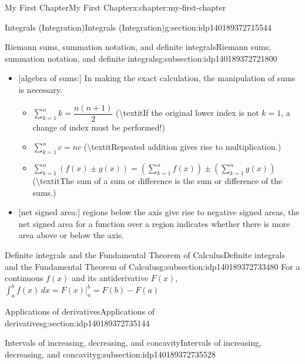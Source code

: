 \documentclass[oneside,10pt,]{book}
\begin{document}
\begin{chapterptx}{My First Chapter}{}{My First Chapter}{}{}{x:chapter:my-first-chapter}
\begin{sectionptx}{Integrals (Integration)}{}{Integrals (Integration)}{}{}{g:section:idp140189372715544}
\begin{subsectionptx}{Riemann sums, summation notation, and definite integrals}{}{Riemann sums, summation notation, and definite integrals}{}{}{g:subsection:idp140189372721800}
\begin{itemize}[label=\textbullet]
\item{}[algebra of sums:] In making the exact calculation, the manipulation of sums is necessary.%
%
\begin{itemize}[label=$\circ$]
\item{}\(\displaystyle \sum_{k=1}^n k = \dfrac{n(n+1)}{2}\) (\textbackslash{}textit\textbraceleft{}If the original lower index is not \(k=1\), a change of index must be performed!\textbraceright{})%
\item{}\(\displaystyle \sum_{k=1}^n c = nc\) (\textbackslash{}textit\textbraceleft{}Repeated addition gives rise to multiplication.\textbraceright{})%
\item{}\(\displaystyle \sum_{k=1}^n \left(f(x) \pm g(x)\right) = \left(\sum_{k=1}^n f(x)\right) \pm \left(\sum_{k=1}^ng(x)\right)\) (\textbackslash{}textit\textbraceleft{}The sum of a sum or difference is the sum or difference of the sums.\textbraceright{})%
\end{itemize}
\item{}[net signed area:] regions below the axis give rise to negative signed areas, the net signed area for a function over a region indicates whether there is more area above or below the axis.%
\end{itemize}
\end{subsectionptx}
%
%
\typeout{************************************************}
\typeout{************************************************}
%
\begin{subsectionptx}{Definite integrals and the Fundamental Theorem of Calculus}{}{Definite integrals and the Fundamental Theorem of Calculus}{}{}{g:subsection:idp140189372733480}
For a continuous \(f(x)\) and its antiderivative \(F(x)\), \(\displaystyle\int_a^b f(x)\,dx = F(x)\Big|_a^b = F(b) - F(a)\)%
\end{subsectionptx}
\end{sectionptx}
%
%
\typeout{************************************************}
\typeout{************************************************}
%
\begin{sectionptx}{Applications of derivatives}{}{Applications of derivatives}{}{}{g:section:idp140189372735144}
%
%
\typeout{************************************************}
\typeout{************************************************}
%
\begin{subsectionptx}{Intervals of increasing, decreasing, and concavity}{}{Intervals of increasing, decreasing, and concavity}{}{}{g:subsection:idp140189372735528}

\end{subsectionptx}
\end{sectionptx}
\end{chapterptx}
\end{document}
